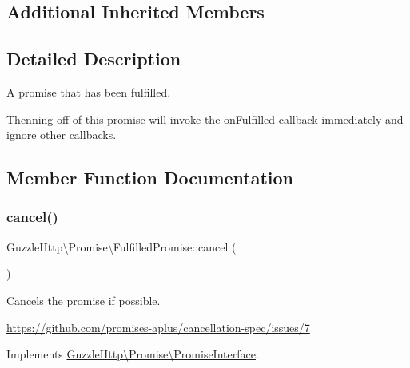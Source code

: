 \subsection*{Additional Inherited Members}


\subsection{Detailed Description}
A promise that has been fulfilled.

Thenning off of this promise will invoke the on\+Fulfilled callback immediately and ignore other callbacks. 

\subsection{Member Function Documentation}
\mbox{\label{classGuzzleHttp_1_1Promise_1_1FulfilledPromise_a2a1ed3ce2a277fef457c47e347ce3b8a}} 
\subsubsection{\texorpdfstring{cancel()}{cancel()}}
{\footnotesize\ttfamily Guzzle\+Http\textbackslash{}\+Promise\textbackslash{}\+Fulfilled\+Promise\+::cancel (\begin{DoxyParamCaption}{ }\end{DoxyParamCaption})}

Cancels the promise if possible.

\hyperlink{}{https\+://github.\+com/promises-\/aplus/cancellation-\/spec/issues/7}

Implements \hyperlink{interfaceGuzzleHttp_1_1Promise_1_1PromiseInterface_ab3f2eb63d775492446ab3784618aeef8}{Guzzle\+Http\textbackslash{}\+Promise\textbackslash{}\+Promise\+Interface}.

\mbox{\label{classGuzzleHttp_1_1Promise_1_1FulfilledPromise_a573e5b00f2e5a280190d101a128a4748}} 
